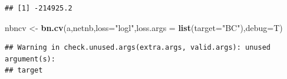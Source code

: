 \documentclass[]{article}
\newenvironment{Shaded}{\begin{snugshade}}{\end{snugshade}}
\newcommand{\KeywordTok}[1]{\textcolor[rgb]{0.13,0.29,0.53}{\textbf{{#1}}}}
\newcommand{\DataTypeTok}[1]{\textcolor[rgb]{0.13,0.29,0.53}{{#1}}}
\newcommand{\StringTok}[1]{\textcolor[rgb]{0.31,0.60,0.02}{{#1}}}
\newcommand{\NormalTok}[1]{{#1}}
\begin{document}
\begin{verbatim}
## [1] -214925.2
\end{verbatim}

\begin{Shaded}
\begin{Highlighting}[]
\NormalTok{nbncv <-}\StringTok{ }\KeywordTok{bn.cv}\NormalTok{(a,netnb,}\DataTypeTok{loss=}\StringTok{"logl"}\NormalTok{,}\DataTypeTok{loss.args =} \KeywordTok{list}\NormalTok{(}\DataTypeTok{target=}\StringTok{"BC"}\NormalTok{),}\DataTypeTok{debug=}\NormalTok{T)}
\end{Highlighting}
\end{Shaded}

\begin{verbatim}
## Warning in check.unused.args(extra.args, valid.args): unused argument(s):
## target
\end{verbatim}
\end{document}
